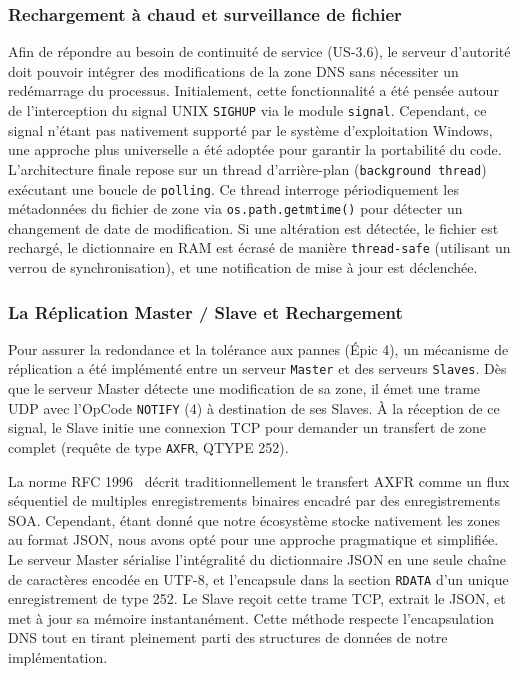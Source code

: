 \subsubsection{Rechargement à chaud et surveillance de fichier}
Afin de répondre au besoin de continuité de service (US-3.6), le serveur d'autorité doit pouvoir intégrer des modifications de la zone DNS sans nécessiter un redémarrage du processus.
Initialement, cette fonctionnalité a été pensée autour de l'interception du signal UNIX \texttt{SIGHUP} via le module \texttt{signal}.
Cependant, ce signal n'étant pas nativement supporté par le système d'exploitation Windows, une approche plus universelle a été adoptée pour garantir la portabilité du code.
L'architecture finale repose sur un thread d'arrière-plan (\texttt{background thread}) exécutant une boucle de \texttt{polling}.
Ce thread interroge périodiquement les métadonnées du fichier de zone via \texttt{os.path.getmtime()} pour détecter un changement de date de modification.
Si une altération est détectée, le fichier est rechargé, le dictionnaire en RAM est écrasé de manière \texttt{thread-safe} (utilisant un verrou de synchronisation), et une notification de mise à jour est déclenchée.

\subsubsection{La Réplication Master / Slave et Rechargement}
Pour assurer la redondance et la tolérance aux pannes (Épic 4), un mécanisme de réplication a été implémenté entre un serveur \texttt{Master} et des serveurs \texttt{Slaves}.
Dès que le serveur Master détecte une modification de sa zone, il émet une trame UDP avec l'OpCode \texttt{NOTIFY} (4) à destination de ses Slaves.
À la réception de ce signal, le Slave initie une connexion TCP pour demander un transfert de zone complet (requête de type \texttt{AXFR}, QTYPE 252).

La norme RFC 1996~\cite{rfc1996} décrit traditionnellement le transfert AXFR comme un flux séquentiel de multiples enregistrements binaires encadré par des enregistrements SOA.
Cependant, étant donné que notre écosystème stocke nativement les zones au format JSON, nous avons opté pour une approche pragmatique et simplifiée.
Le serveur Master sérialise l'intégralité du dictionnaire JSON en une seule chaîne de caractères encodée en UTF-8, et l'encapsule dans la section \texttt{RDATA} d'un unique enregistrement de type 252.
Le Slave reçoit cette trame TCP, extrait le JSON, et met à jour sa mémoire instantanément.
Cette méthode respecte l'encapsulation DNS tout en tirant pleinement parti des structures de données de notre implémentation.

